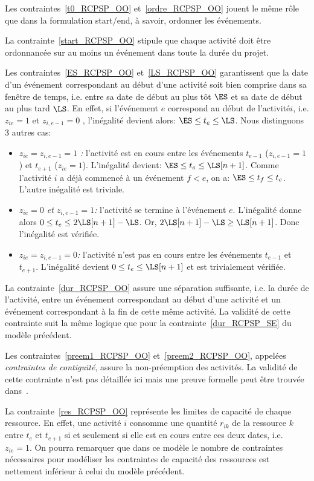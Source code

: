 Les contraintes~\eqref{t0_RCPSP_OO} et~\eqref{ordre_RCPSP_OO} jouent
le même rôle que dans la formulation start/end, à savoir, ordonner
les événements.

La contrainte~\eqref{start_RCPSP_OO} stipule que chaque activité
doit être ordonnancée sur au moins un événement dans toute la durée du projet.
 
Les contraintes~\eqref{ES_RCPSP_OO} et~\eqref{LS_RCPSP_OO}
garantissent que la date d'un événement correspondant au début
d'une activité soit bien comprise dans sa fenêtre de temps, i.e.
entre sa date de début au plus tôt $\ES$ et sa date de début au
plus tard $\LS$. En effet, si l'événement $e$ correspond au début
de l'activité$i$, i.e. $z_{ie}=1$ et $z_{i,e-1}=0$ , l'inégalité
devient alors: $\ES \le t_e \le \LS$. Nous distinguons 3 autres
cas: \begin{itemize} \item {\it $z_{ie}=z_{i,e-1}=1$ :} l'activité
est en cours entre les événements $t_{e-1}$ ($z_{i,e-1}=1$) et
$t_{e+1}$ ($z_{ie}=1$). L'inégalité devient: $\ES\le t_e \le
\LS[n+1]$. Comme l'activité $i$ a déjà commencé à un événement $f
<e$, on a: $\ES \le t_f \le t_e$. L'autre inégalité est triviale.
\item {\it$z_{ie}=0$ et $z_{i,e-1}=1$:} l'activité se termine à
l'événement $e$. L'inégalité donne alors $0 \le t_e \le
2\LS[n+1]-\LS$. Or, $2\LS[n+1] -\LS \ge \LS[n+1]$. Donc
l'inégalité est vérifiée. \item {\it $z_{ie}=z_{i,e-1}=0$:}
l'activité n'est pas en cours entre les événements $t_{e-1}$ et
$t_{e+1}$. L'inégalité devient $0 \le t_e \le \LS[n+1]$ et est
trivialement vérifiée. \end{itemize}

La contrainte~\eqref{dur_RCPSP_OO} assure une séparation
suffisante, i.e. la durée de l'activité, entre un événement
correspondant au début d'une activité et un événement
correspondant à la fin de cette même activité. La validité de
cette contrainte suit la même logique que pour la
contrainte~\eqref{dur_RCPSP_SE} du modèle précédent.

Les contraintes~\eqref{preem1_RCPSP_OO}
et~\eqref{preem2_RCPSP_OO}, appelées {\it contraintes de
contiguïté}, assure la non-préemption des activités. La validité
de cette contrainte n'est pas détaillée ici mais une preuve
formelle peut être trouvée dans~\cite{modele_RCPSP}.

La contrainte~\eqref{res_RCPSP_OO} représente les limites de
capacité de chaque ressource. En effet, une activité $i$ consomme
une quantité $r_{ik}$ de la ressource $k$ entre $t_e$ et $t_{e+1}$
si et seulement si elle est en cours entre ces deux dates, i.e.
$z_{ie}=1$. On pourra remarquer que dans ce modèle le nombre de
contraintes nécessaires pour modéliser les contraintes de capacité
des ressources est nettement inférieur à celui du modèle précédent.

